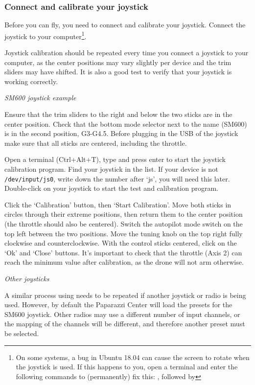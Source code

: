 \subsubsection*{Connect and calibrate your joystick}
Before you can fly, you need to connect and calibrate your joystick.
Connect the joystick to your computer\footnote{On some systems, a bug in Ubuntu 18.04 can cause the screen to rotate when the joystick is used. If this happens to you, open a terminal and enter the following commands to (permanently) fix this: , followed by }.

Joystick calibration should be repeated every time you connect a joystick to your computer, as the center positions may vary slightly per device and the trim sliders may have shifted. It is also a good test to verify that your joystick is working correctly.

\textit{SM600 joystick example}

Ensure that the trim sliders to the right and below the two sticks are in the center position. Check that the bottom mode selector next to the name (SM600) is in the second position, G3-G4.5. Before plugging in the USB of the joystick make sure that all sticks are centered, including the throttle.

Open a terminal (Ctrl+Alt+T), type  and press enter to start the joystick calibration program. Find your joystick in the list. If your device is not \verb"/dev/input/js0", write down the number after `js', you will need this later. Double-click on your joystick to start the test and calibration program.

Click the `Calibration' button, then `Start Calibration'. Move both sticks in circles through their extreme positions, then return them to the center position (the throttle should also be centered). Switch the autopilot mode switch on the top left between the two positions. Move the tuning knob on the top right fully clockwise and counterclockwise. With the control sticks centered, click on the `Ok' and `Close' buttons. It's important to check that the throttle (Axis 2) can reach the minimum value after calibration, as the drone will not arm otherwise.

\textit{Other joysticks}

A similar process using  needs to be repeated if another joystick or radio is being used. However, by default the Paparazzi Center will load the presets for the SM600 joystick. Other radios may use a different number of input channels, or the mapping of the channels will be different, and therefore another preset must be selected.

